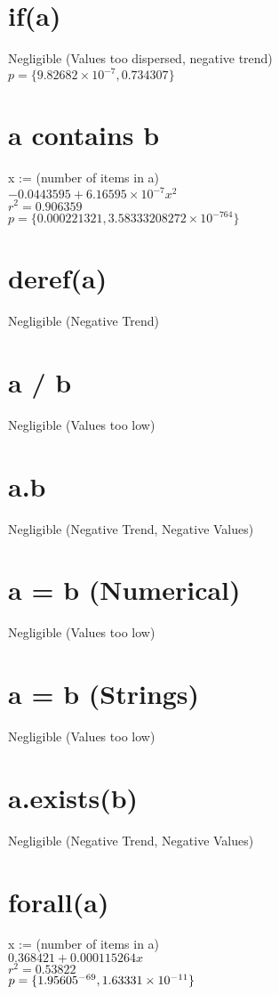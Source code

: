 \documentclass[12pt]{article}
\begin{document}
	\section{if(a)}
	Negligible (Values too dispersed, negative trend)\\
	$p = \{9.82682 \times 10^{-7}, 0.734307\}$
	
	\section{a contains b}
	x := (number of items in a)\\
	$-0.0443595 + 6.16595 \times 10^{-7} x^2$\\
	$r^2 = 0.906359$\\
	$p = \{0.000221321, 3.58333208272 \times 10^{-764}\}$
	
	\section{deref(a)}
	Negligible (Negative Trend)
	
	\section{a / b}
	Negligible (Values too low)
	
	\section{a.b}
	Negligible (Negative Trend, Negative Values)
	
	\section{a = b (Numerical)}
	Negligible (Values too low)
	
	\section{a = b (Strings)}
	Negligible (Values too low)
	
	\section{a.exists(b)}
	Negligible (Negative Trend, Negative Values)
	
	\section{forall(a)}
	x := (number of items in a)\\
	$0.368421 + 0.000115264 x$\\
	$r^2 = 0.53822$\\
	$p = \{1.95605 \time 10^{-69}, 1.63331 \times 10^{-11}\}$
	
\end{document}
